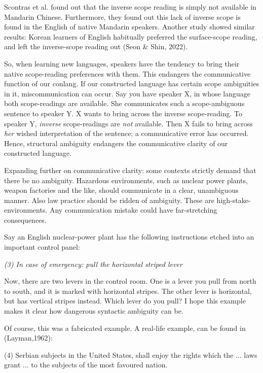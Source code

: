\noindent Scontras et al. found  out that the inverse scope reading is simply not available in Mandarin Chinese. Furthermore, they found  out this lack of inverse scope is found  in the English of native Mandarin speakers. Another study showed similar results: Korean learners of English habitually preferred the surface-scope reading, and left the inverse-scope reading out (Seon \& Shin, 2022). 

So, when learning new languages, speakers have the tendency to bring their native scope-reading preferences with them. This endangers the communicative function of our conlang. If our constructed language has certain scope ambiguities in it, miscommunication can occur. Say you have speaker X, in whose language both scope-readings are available. She communicates such a scope-ambiguous sentence to speaker Y. X wants to bring across the inverse scope-reading. To speaker Y, {\it inverse} scope-readings are {\it not} available. Then X fails to bring across {\it her} wished interpretation of the sentence; a communicative error has occurred. Hence, structural ambiguity endangers the communicative clarity of our constructed language. 

Expanding further on communicative clarity: some contexts strictly demand that there be no ambiguity. Hazardous environments, such as nuclear power plants, weapon factories and the like, should communicate in a clear, unambiguous manner. Also law practice should be ridden of ambiguity. These are high-stake-environments. Any communication mistake could have far-stretching consequences. 

Say an English nuclear-power plant has the following instructions etched into an important control panel: 

\begin{center}
	{\it (3) In case of emergency: pull the horizontal striped lever} 
\end{center}

\noindent Now, there are two levers in the control room. One is a lever you pull from north to south, and it is marked with horizontal stripes. The other lever is horizontal, but has vertical stripes instead. Which lever do you pull? I hope this example makes it clear how dangerous syntactic ambiguity can be. 

Of course, this was a fabricated example. A real-life example, can be found  in (Layman,1962):

\begin{singlespace*}
{\center  \it

	(4) Serbian subjects in the United States, shall enjoy
the rights which the ... laws grant ... to the subjects of the most favoured nation. 
}
\end{singlespace*}

